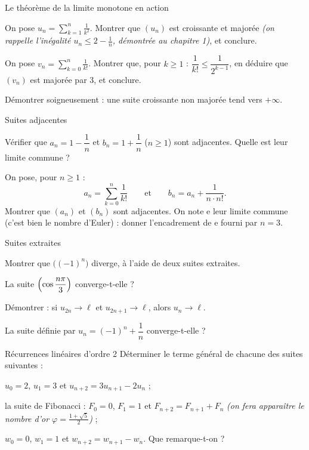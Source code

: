 \begin{exercice}[2]{Le théorème de la limite monotone en action}
\begin{questions}
  \item On pose $u_n=\displaystyle\sum_{k=1}^{n}\frac{1}{k^{2}}$. Montrer que $(u_n)$
    est croissante et majorée \emph{(on rappelle l'inégalité
    $u_n\leq2-\frac1n$, démontrée au chapitre 1)}, et conclure.
  \item On pose $v_n=\displaystyle\sum_{k=0}^{n}\frac{1}{k!}$. Montrer que, pour
    $k\geq1$ : $\dfrac{1}{k!}\leq\dfrac{1}{2^{k-1}}$, en déduire que $(v_n)$
    est majorée par $3$, et conclure.
  \item Démontrer soigneusement : une suite croissante non majorée tend vers
    $+\infty$.
\end{questions}
\end{exercice}

\begin{exercice}[2]{Suites adjacentes}
\begin{questions}
  \item Vérifier que $a_n=1-\dfrac1n$ et $b_n=1+\dfrac1n$ ($n\geq1$) sont
    adjacentes. Quelle est leur limite commune ?
  \item On pose, pour $n\geq1$ :
    \[
      a_n=\sum_{k=0}^{n}\frac{1}{k!}
      \qquad\text{et}\qquad
      b_n=a_n+\frac{1}{n\cdot n!}.
    \]
    Montrer que $(a_n)$ et $(b_n)$ sont adjacentes. On note $\mathrm{e}$
    leur limite commune (c'est bien le nombre d'Euler) : donner
    l'encadrement de $\mathrm{e}$ fourni par $n=3$.
\end{questions}
\end{exercice}

\begin{exercice}[2]{Suites extraites}
\begin{questions}
  \item Montrer que $\bigl((-1)^{n}\bigr)$ diverge, à l'aide de deux suites
    extraites.
  \item La suite $\Bigl(\cos\dfrac{n\pi}{3}\Bigr)$ converge-t-elle ?
  \item Démontrer : si $u_{2n}\to\ell$ et $u_{2n+1}\to\ell$, alors
    $u_n\to\ell$.
  \item La suite définie par $u_n=(-1)^{n}+\dfrac1n$ converge-t-elle ?
\end{questions}
\end{exercice}

\begin{exercice}[2]{Récurrences linéaires d'ordre 2}
Déterminer le terme général de chacune des suites suivantes :
\begin{questions}
  \item $u_0=2$, $u_1=3$ et $u_{n+2}=3u_{n+1}-2u_n$ ;
  \item la suite de Fibonacci : $F_0=0$, $F_1=1$ et $F_{n+2}=F_{n+1}+F_n$
    \emph{(on fera apparaître le nombre d'or $\varphi=\frac{1+\sqrt5}{2}$)} ;
  \item $w_0=0$, $w_1=1$ et $w_{n+2}=w_{n+1}-w_n$. Que remarque-t-on ?
\end{questions}
\end{exercice}

